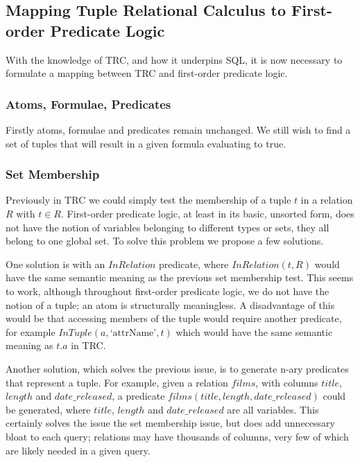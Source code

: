 \documentclass[a4paper, 11pt]{article}
\begin{document}
  \subsection{Mapping Tuple Relational Calculus to First-order Predicate Logic}
    \label{sec:tuplefo}
    With the knowledge of TRC, and how it underpins SQL, it is now necessary to
    formulate a mapping between TRC and first-order predicate logic.

    \subsubsection{Atoms, Formulae, Predicates}
      Firstly atoms, formulae and predicates remain unchanged. We still wish to
      find a set of tuples that will result in a given formula evaluating to
      true.

    \subsubsection{Set Membership}
      Previously in TRC we could simply test the membership of a tuple $t$ in a
      relation $R$ with $t \in R$. First-order predicate logic, at least in its
      basic, unsorted form, does not have the notion of variables belonging to
      different types or sets, they all belong to one global set. To solve this
      problem we propose a few solutions.

      One solution is with an $InRelation$ predicate, where $InRelation(t, R)$
      would have the same semantic meaning as the previous set membership test.
      This seems to work, although throughout first-order predicate logic, we
      do not have the notion of a tuple; an atom is structurally meaningless. A
      disadvantage of this would be that accessing members of the tuple would
      require another predicate, for example $InTuple(a, \text{`attrName'}, t)$
      which would have the same semantic meaning as $t.a$ in TRC.

      Another solution, which solves the previous issue, is to generate n-ary
      predicates that represent a tuple. For example, given a relation $films$,
      with columns $title$, $length$ and $date\_released$, a predicate
      $films(title, length, date\_released)$ could be generated, where $title$,
      $length$ and $date\_released$ are all variables. This certainly solves the
      issue the set membership issue, but does add unnecessary bloat to each
      query; relations may have thousands of columns, very few of which are
      likely needed in a given query.
\end{document}
